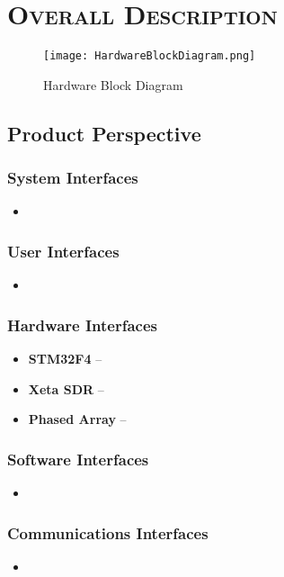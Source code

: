 \documentclass[ProjectRequirements.tex]{subfiles}
\begin{document}
\bigskip

\section{\textsc{\Large Overall Description}}
	\begin{figure}[H]
		\centering
		\texttt{[image: HardwareBlockDiagram.png]}
		\caption{Hardware Block Diagram \label{fig:HardwareBlockDiagram}}
	\end{figure}
	\subsection{Product Perspective}
	
		\subsubsection{System Interfaces}
			\begin{itemize}\itemsep1pt
				\item 
			\end{itemize}	
			
		\subsubsection{User Interfaces}
			\begin{itemize}\itemsep1pt
				\item 
			\end{itemize}
			
		\subsubsection{Hardware Interfaces}
			\begin{itemize}\itemsep1pt
				\item \textbf{STM32F4} -- 
				\item \textbf{Xeta SDR} -- 
				\item \textbf{Phased Array} -- 
			\end{itemize}
			
		\subsubsection{Software Interfaces}
			\begin{itemize}\itemsep1pt
				\item 
			\end{itemize}
			
		\subsubsection{Communications Interfaces}
			\begin{itemize}\itemsep1pt
				\item 
			\end{itemize}
			
\end{document}
